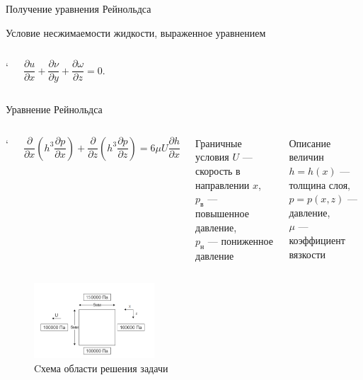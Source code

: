 \documentclass[ignoreonframetext,unicode]{beamer}
\begin{document}
\begin{frame}{Получение уравнения Рейнольдса}
\begin{block}{Условие несжимаемости жидкости, выраженное уравнением}
\begin{columns}
			
			`
			\begin{minipage}[t]{0.2\linewidth}
				
				
				\begin{equation*}
						\frac{\partial u}{\partial x} + \frac{\partial \nu}{\partial y} + \frac{\partial \omega}{\partial z} = 0.
				\end{equation*}
		\end{minipage}
	\end{columns}
		
	\end{block}
		

	

			
			
	\end{frame}

	\begin{frame}{Уравнение Рейнольдса}
		\vspace*{-4mm}
		\begin{columns}
			\column{\textwidth}`
			\begin{block}{}
			 \[
				\frac{\partial}{\partial x} \left(h^3 \frac{\partial p}{\partial x} \right) + \frac{\partial}{\partial z} \left(h^3 \frac{\partial p}{\partial z} \right) = 6 \mu U \frac{\partial h}{\partial x}
			 \]
			\end{block}

\vspace*{-2mm}
		\begin{columns}
			\begin{block}{Граничные условия}
				$U$ --- скорость в направлении $x$,\\ 
				$p_{\text{в}}$ --- повышенное давление,\\ 
				$p_{\text{н}}$ --- пониженное давление
			\end{block}
		
			\begin{block}{Описание величин}
			$h = h(x)$ --- толщина слоя, \\
			$p = p(x, z)$ --- давление, \\
			$\mu$ --- коэффициент вязкости
			\end{block}
		\end{columns}

		\end{columns}
		
		\begin{figure}[!htbp]
			\centering
			\includegraphics[width=0.4\textwidth]{taskGU}%
			\caption{Cхема области решения задачи}
			\vspace*{-2mm}
			\label{ser_graph}
		\end{figure}
		

\end{frame}
\end{document}
